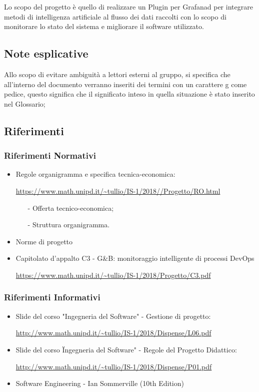 \documentclass[12pt]{article}
\begin{document}
			Lo scopo del progetto è quello di realizzare un Plugin per Grafana\ped d per integrare metodi di intelligenza artificiale al flusso dei dati raccolti con lo scopo di monitorare lo stato del sistema e migliorare il software utilizzato.

		\subsection{Note esplicative}

			Allo scopo di evitare ambiguità a lettori esterni al gruppo, si specifica che all'interno del documento verranno inseriti dei termini con un carattere g come pedice, questo significa che il significato inteso in quella situazione è stato inserito nel Glossario;

		\newpage
		\subsection{Riferimenti}

			\subsubsection{Riferimenti Normativi}
				\begin{itemize}
					\item Regole organigramma e specifica tecnica-economica:

					\url{https://www.math.unipd.it/~tullio/IS-1/2018//Progetto/RO.html}
						\begin{itemize}
							\item[-] Offerta tecnico-economica;
							\item[-]Struttura organigramma.
						\end{itemize}
					\item Norme di progetto
					\item Capitolato d'appalto C3 - G\&B: monitoraggio intelligente di processi DevOps
					
					\url{https://www.math.unipd.it/~tullio/IS-1/2018/Progetto/C3.pdf}
				\end{itemize}
				
			\subsubsection{Riferimenti Informativi}
				\begin{itemize}
					\item Slide del corso "Ingegneria del Software" - Gestione di progetto:
					
					\url{http://www.math.unipd.it/~tullio/IS-1/2018/Dispense/L06.pdf}
					\item Slide del corso \"Ingegneria del Software" - Regole del Progetto Didattico:

					\url{http://www.math.unipd.it/~tullio/IS-1/2018/Dispense/P01.pdf}

					\item Software Engineering - Ian Sommerville (10th Edition)
				\end{itemize}
\end{document}
